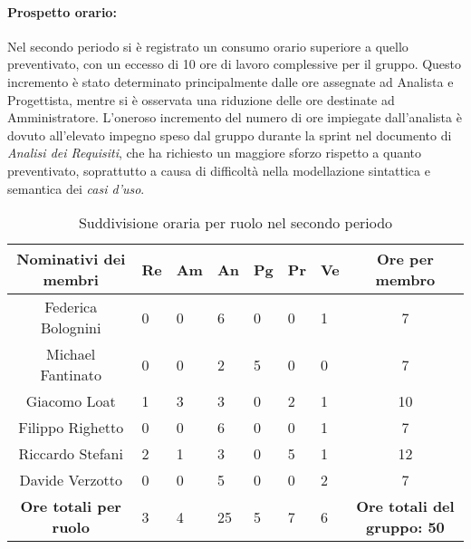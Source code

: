 \paragraph{Prospetto orario: }
Nel secondo periodo si è registrato un consumo orario superiore a quello preventivato, con un eccesso di 10 ore di lavoro complessive per il gruppo. Questo incremento è stato determinato principalmente dalle ore assegnate ad Analista e Progettista, mentre si è osservata una riduzione delle ore destinate ad Amministratore.
L'oneroso incremento del numero di ore impiegate dall'analista è dovuto all'elevato impegno speso dal gruppo durante la sprint nel documento di \emph{Analisi dei Requisiti}, che ha richiesto un maggiore sforzo rispetto a quanto preventivato, soprattutto a causa di difficoltà nella modellazione sintattica e semantica dei \emph{casi d'uso}.\\
\begin{table}[h!]
    \centering
    \renewcommand{\arraystretch}{1.5}
    \begin{tabularx}{\textwidth}{|c|X|X|X|X|X|X|c|}\hline
    \rowcolor[HTML]{FFD700} 
    \textbf{Nominativi dei membri} & \textbf{Re} & \textbf{Am} & \textbf{An} & \textbf{Pg} & \textbf{Pr} & \textbf{Ve} & \textbf{Ore per membro} \\ \hline
    Federica Bolognini & 0 & 0 & 6 & 0 & 0 & 1 & 7  \\ \hline
    Michael Fantinato  & 0 & 0 & 2 & 5 & 0 & 0 & 7  \\ \hline
    Giacomo Loat       & 1 & 3 & 3 & 0 & 2 & 1 & 10 \\ \hline
    Filippo Righetto   & 0 & 0 & 6 & 0 & 0 & 1 & 7  \\ \hline
    Riccardo Stefani   & 2 & 1 & 3 & 0 & 5 & 1 & 12 \\ \hline
    Davide Verzotto    & 0 & 0 & 5 & 0 & 0 & 2 & 7  \\ \hline
    \rowcolor[HTML]{FFD700} 
    \textbf{Ore totali per ruolo} & 3 & 4 & 25 & 5 & 7 & 6 & \textbf{Ore totali del gruppo: 50} \\ \hline
    \end{tabularx}
    \caption{Suddivisione oraria per ruolo nel secondo periodo}
\end{table}

